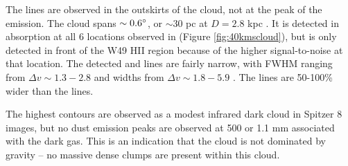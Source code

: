 The \formaldehyde lines are observed in the outskirts of the cloud, not at
the peak of the \thirteenco emission.  The cloud spans $\sim0.6^{\circ}$, or
$\sim30$ pc at $D=2.8$ kpc \citep{Roman-Duval2009a}.  It is detected in \oneone
absorption at all 6 locations observed in \formaldehyde (Figure
\ref{fig:40kmscloud}), but \twotwo is only detected in front of the W49 HII
region because of the higher signal-to-noise at that location.  The detected
\thirteenco and \formaldehyde lines are fairly narrow, with \formaldehyde FWHM
ranging from $\Delta v \sim1.3-2.8$ \kms and \thirteenco widths from $\Delta v \sim1.8-5.9$
\kms.  The \thirteenco lines are 50-100\% wider than the \formaldehyde lines.

The highest \thirteenco contours are observed as a modest infrared dark cloud
in Spitzer 8 \um images, but no dust emission peaks are observed at 500 \um
\citep[Herschel;][]{Traficante2011a} or 1.1 mm
\citep[Bolocam;][]{Aguirre2011a,Ginsburg2013b} associated with the dark gas.
This is an indication that the cloud is not dominated by gravity -- no
massive dense clumps are present within this cloud.


